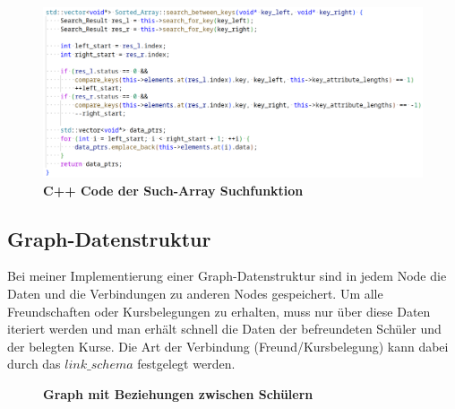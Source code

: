 \documentclass[11pt,a4paper]{article}
\begin{document}

\begin{figure}[H]
    \centering
    \includegraphics[width=1.1\textwidth]{./res/code_sort_array.png}
    \caption{\textbf{C++ Code der Such-Array Suchfunktion}}
\end{figure}

\subsection{Graph-Datenstruktur}

Bei meiner Implementierung einer Graph-Datenstruktur sind in jedem Node
die Daten und die Verbindungen zu anderen Nodes gespeichert.
Um alle Freundschaften oder Kursbelegungen zu erhalten, muss nur über diese
Daten iteriert werden und man erhält schnell die Daten der befreundeten Schüler und der
belegten Kurse. Die Art der Verbindung (Freund/Kursbelegung) kann dabei durch
das $link\_schema$ festgelegt werden.

\begin{figure}[H]
    \centering
    \caption{\textbf{Graph mit Beziehungen zwischen Schülern}}
\end{figure}
\end{document}
